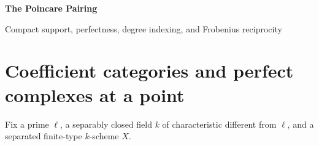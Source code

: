 \documentclass[10pt]{article}
\theoremstyle{definition}
\begin{document}
\begin{center}
{\large\bfseries The Poincare Pairing\par}
\medskip
{\normalsize Compact support, perfectness, degree indexing, and Frobenius reciprocity\par}
\end{center}

\begin{abstract}
For a smooth separated \(d\)-dimensional scheme, Verdier duality and smooth
purity produce a perfect pairing between compactly supported cohomology and
ordinary cohomology.  This note gives the complete chain of definitions and
intermediate statements: global sections, compact support, point
perfectness, cup product, evaluation, trace, derived perfectness,
cohomological indexing, Frobenius similitude, and the proper and relative
smooth-proper forms.
\end{abstract}

\tableofcontents

\section{Coefficient categories and perfect complexes at a point}

Fix a prime \(\ell\), a separably closed field \(k\) of characteristic
different from \(\ell\), and a separated finite-type \(k\)-scheme \(X\).
\end{document}

